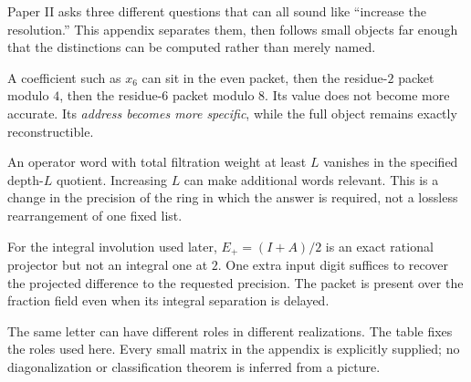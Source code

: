 
Paper II asks three different questions that can all sound like ``increase the resolution.'' This appendix separates them, then follows small objects far enough that the distinctions can be computed rather than merely named.


A coefficient such as $x_6$ can sit in the even packet, then the residue-$2$ packet modulo $4$, then the residue-$6$ packet modulo $8$. Its value does not become more accurate. Its \emph{address becomes more specific}, while the full object remains exactly reconstructible.

An operator word with total filtration weight at least $L$ vanishes in the specified depth-$L$ quotient. Increasing $L$ can make additional words relevant. This is a change in the precision of the ring in which the answer is required, not a lossless rearrangement of one fixed list.

For the integral involution used later, $E_+=(I+A)/2$ is an exact rational projector but not an integral one at $2$. One extra input digit suffices to recover the projected difference to the requested precision. The packet is present over the fraction field even when its integral separation is delayed.


The same letter can have different roles in different realizations. The table fixes the roles used here. Every small matrix in the appendix is explicitly supplied; no diagonalization or classification theorem is inferred from a picture.

